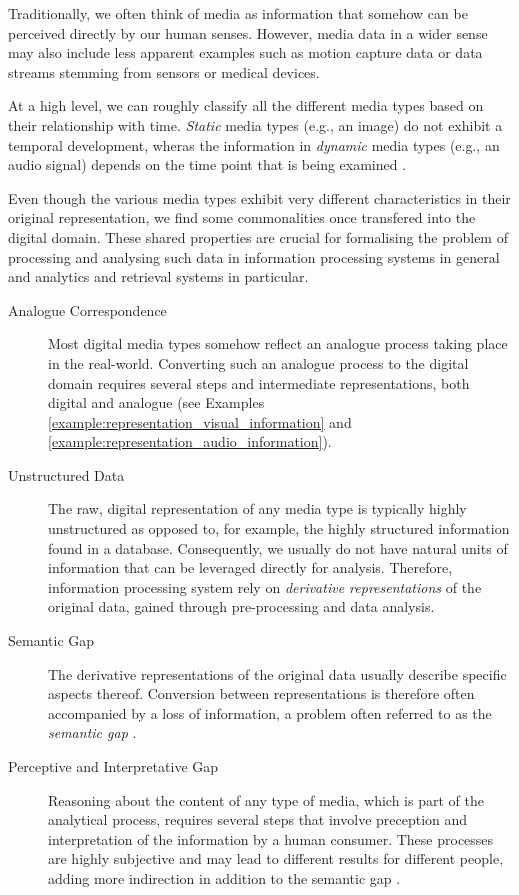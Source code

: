 Traditionally, we often think of media as information that somehow can be perceived directly by our human senses. However, media data in a wider sense may also include less apparent examples such as motion capture data or data streams stemming from sensors or medical devices. 

At a high level, we can roughly classify all the different media types based on their relationship with time. \emph{Static} media types (e.g., an image) do not exhibit a temporal development, wheras the information in \emph{dynamic} media types (e.g., an audio signal) depends on the time point that is being examined \cite{Blanken:2007multimedia}.

Even though the various media types exhibit very different characteristics in their original representation, we find some commonalities once transfered into the digital domain. These shared properties are crucial for formalising the problem of processing and analysing such data in information processing systems in general and analytics and retrieval systems in particular.

\begin{description}
    \item[Analogue Correspondence] Most digital media types somehow reflect an analogue process taking place in the real-world. Converting such an analogue process to the digital domain requires several steps and intermediate representations, both digital and analogue (see Examples \ref{example:representation_visual_information} and \ref{example:representation_audio_information}).

    \item[Unstructured Data] The raw, digital representation of any media type is typically highly unstructured as opposed to, for example, the highly structured information found in a database. Consequently, we usually do not have natural units of information that can be leveraged directly for analysis. Therefore, information processing system rely on \emph{derivative representations} of the original data, gained through pre-processing and data analysis.
    
    \item[Semantic Gap] The derivative representations of the original data usually describe specific aspects thereof. Conversion between representations is therefore often accompanied by a loss of information, a problem often referred to as the \emph{semantic gap} \cite{Blanken:2007multimedia, Rossetto:2018thesis}.

    \item[Perceptive and Interpretative Gap] Reasoning about the content of any type of media, which is part of the analytical process, requires several steps that involve preception and interpretation of the information by a human consumer. These processes are highly subjective and may lead to different results for different people, adding more indirection in addition to the semantic gap \cite{Rossetto:2018thesis}.
\end{description}

